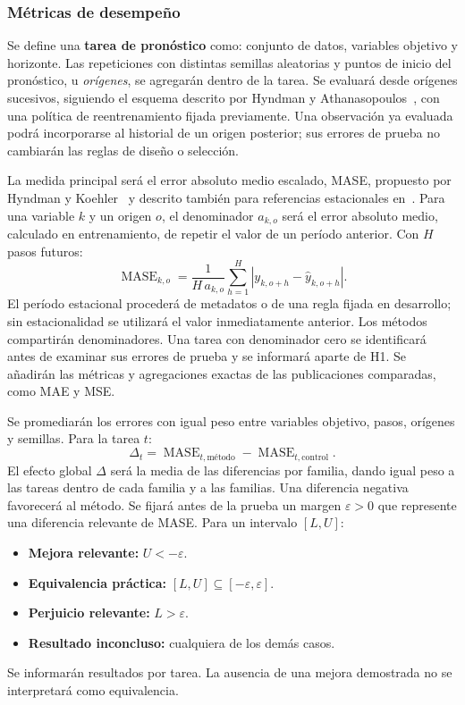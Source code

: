 \documentclass[11pt,letterpaper]{article}
\begin{document}
\subsubsection{Métricas de desempeño}
\label{sec:medidas}

Se define una \textbf{tarea de pronóstico} como: conjunto de datos, variables objetivo y horizonte. Las repeticiones con distintas semillas aleatorias y puntos de inicio del pronóstico, u \emph{orígenes}, se agregarán dentro de la tarea. Se evaluará desde orígenes sucesivos, siguiendo el esquema descrito por Hyndman y Athanasopoulos~\cite{hyndman2021tscv}, con una política de reentrenamiento fijada previamente. Una observación ya evaluada podrá incorporarse al historial de un origen posterior; sus errores de prueba no cambiarán las reglas de diseño o selección.

La medida principal será el error absoluto medio escalado, MASE, propuesto por Hyndman y Koehler~\cite{hyndman2006mase} y descrito también para referencias estacionales en~\cite{hyndman2021tscv}. Para una variable $k$ y un origen $o$, el denominador $a_{k,o}$ será el error absoluto medio, calculado en entrenamiento, de repetir el valor de un período anterior. Con $H$ pasos futuros:
\begin{equation}
\operatorname{MASE}_{k,o}=\frac{1}{H\,a_{k,o}}\sum_{h=1}^{H}|y_{k,o+h}-\widehat y_{k,o+h}|.
\end{equation}
El período estacional procederá de metadatos o de una regla fijada en desarrollo; sin estacionalidad se utilizará el valor inmediatamente anterior. Los métodos compartirán denominadores. Una tarea con denominador cero se identificará antes de examinar sus errores de prueba y se informará aparte de H1. Se añadirán las métricas y agregaciones exactas de las publicaciones comparadas, como MAE y MSE.

Se promediarán los errores con igual peso entre variables objetivo, pasos, orígenes y semillas. Para la tarea $t$:
\begin{equation}
\Delta_t=\operatorname{MASE}_{t,\text{método}}-\operatorname{MASE}_{t,\text{control}}.
\end{equation}
El efecto global $\Delta$ será la media de las diferencias por familia, dando igual peso a las tareas dentro de cada familia y a las familias. Una diferencia negativa favorecerá al método. Se fijará antes de la prueba un margen $\varepsilon>0$ que represente una diferencia relevante de MASE. Para un intervalo $[L,U]$:
\begin{itemize}
\item \textbf{Mejora relevante:} $U<-\varepsilon$.
\item \textbf{Equivalencia práctica:} $[L,U]\subseteq[-\varepsilon,\varepsilon]$.
\item \textbf{Perjuicio relevante:} $L>\varepsilon$.
\item \textbf{Resultado inconcluso:} cualquiera de los demás casos.
\end{itemize}
Se informarán resultados por tarea. La ausencia de una mejora demostrada no se interpretará como equivalencia.
\end{document}
